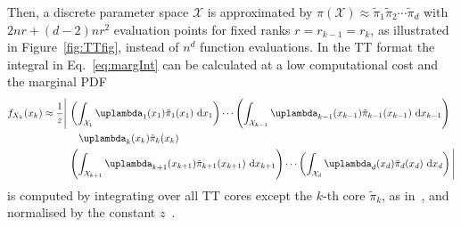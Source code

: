 Then, a discrete parameter space $\mathcal{X}$ is approximated by $\pi(\mathcal{X})\approx \tilde{\pi}_1  \tilde{\pi}_2  \cdots \tilde{\pi}_d$ with $2nr + (d-2)nr^2$ evaluation points for fixed ranks $r =r_{k-1} = r_k $, as illustrated in Figure~\ref{fig:TTfig}, instead of $n^d$ function evaluations.
In the TT format the integral in Eq.~\ref{eq:margInt} can be calculated at a low computational cost and the marginal PDF
\begin{align}
	\begin{split}
		f_{X_k}(x_k) \approx \frac{1}{z} \Bigg|\, 
		&\left( \int_{\mathcal{X}_1} \uplambda_1(x_1) \tilde{\pi}_1(x_1) \, \diff x_1 \right) \cdots 
		\left( \int_{\mathcal{X}_{k-1}} \uplambda_{k-1}(x_{k-1}) \tilde{\pi}_{k-1}(x_{k-1}) \, \diff x_{k-1} \right) \\
		&\quad \uplambda_k(x_k) \tilde{\pi}_k(x_k) \\
		& \left( \int_{\mathcal{X}_{k+1}} \uplambda_{k+1}(x_{k+1}) \tilde{\pi}_{k+1}(x_{k+1}) \,\diff x_{k+1} \right) \cdots 
		\left( \int_{\mathcal{X}_{d}} \uplambda_d(x_d) \tilde{\pi}_d(x_d) \, \diff x_d \right)
		\Bigg| 
	\end{split}
\end{align}
is computed by integrating over all TT cores except the $k$-th core $\tilde{\pi}_k$, as in~\cite{dolgov2020approximation}, and normalised by the constant $z$~\cite{cui2022deep}.


